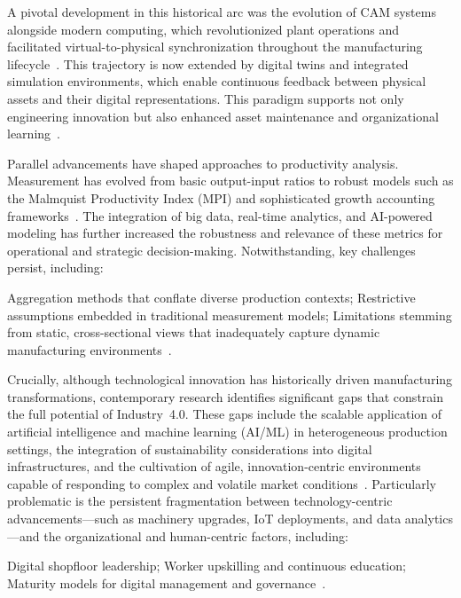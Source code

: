 \documentclass[sigconf]{acmart}
\begin{document}
A pivotal development in this historical arc was the evolution of CAM systems alongside modern computing, which revolutionized plant operations and facilitated virtual-to-physical synchronization throughout the manufacturing lifecycle~\cite{ref54}. This trajectory is now extended by digital twins and integrated simulation environments, which enable continuous feedback between physical assets and their digital representations. This paradigm supports not only engineering innovation but also enhanced asset maintenance and organizational learning~\cite{ref67}.

Parallel advancements have shaped approaches to productivity analysis. Measurement has evolved from basic output-input ratios to robust models such as the Malmquist Productivity Index (MPI) and sophisticated growth accounting frameworks~\cite{ref86}. The integration of big data, real-time analytics, and AI-powered modeling has further increased the robustness and relevance of these metrics for operational and strategic decision-making. Notwithstanding, key challenges persist, including:

Aggregation methods that conflate diverse production contexts;
Restrictive assumptions embedded in traditional measurement models;
Limitations stemming from static, cross-sectional views that inadequately capture dynamic manufacturing environments~\cite{ref86}.

Crucially, although technological innovation has historically driven manufacturing transformations, contemporary research identifies significant gaps that constrain the full potential of Industry~4.0. These gaps include the scalable application of artificial intelligence and machine learning (AI/ML) in heterogeneous production settings, the integration of sustainability considerations into digital infrastructures, and the cultivation of agile, innovation-centric environments capable of responding to complex and volatile market conditions~\cite{ref41,ref63,ref86}. Particularly problematic is the persistent fragmentation between technology-centric advancements---such as machinery upgrades, IoT deployments, and data analytics---and the organizational and human-centric factors, including:

Digital shopfloor leadership;
Worker upskilling and continuous education;
Maturity models for digital management and governance~\cite{ref92}.
\end{document}
